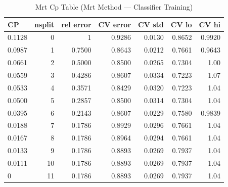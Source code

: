 \begin{table}[htbp]
  \centering
  \caption{Mrt Cp Table (Mrt Method — Classifier Training)}
  \label{tab:MRT_Method_classifier_training_tables_mrt_cp_table}
  \small
  \begin{tabular}{lrrrrrr}
    \toprule
    CP & nsplit & rel error & CV error & CV std & CV lo & CV hi \\
    \midrule
    0.1128 & 0 & 1 & 0.9286 & 0.0130 & 0.8652 & 0.9920 \\
    0.0987 & 1 & 0.7500 & 0.8643 & 0.0212 & 0.7661 & 0.9643 \\
    0.0661 & 2 & 0.5000 & 0.8500 & 0.0265 & 0.7304 & 1.00 \\
    0.0559 & 3 & 0.4286 & 0.8607 & 0.0334 & 0.7223 & 1.07 \\
    0.0533 & 4 & 0.3571 & 0.8429 & 0.0320 & 0.7223 & 1.04 \\
    0.0500 & 5 & 0.2857 & 0.8500 & 0.0314 & 0.7304 & 1.04 \\
    0.0395 & 6 & 0.2143 & 0.8607 & 0.0229 & 0.7580 & 0.9839 \\
    0.0188 & 7 & 0.1786 & 0.8929 & 0.0296 & 0.7661 & 1.04 \\
    0.0167 & 8 & 0.1786 & 0.8964 & 0.0294 & 0.7661 & 1.04 \\
    0.0133 & 9 & 0.1786 & 0.8893 & 0.0269 & 0.7937 & 1.04 \\
    0.0111 & 10 & 0.1786 & 0.8893 & 0.0269 & 0.7937 & 1.04 \\
    0 & 11 & 0.1786 & 0.8893 & 0.0269 & 0.7937 & 1.04 \\
    \bottomrule
  \end{tabular}
\end{table}
